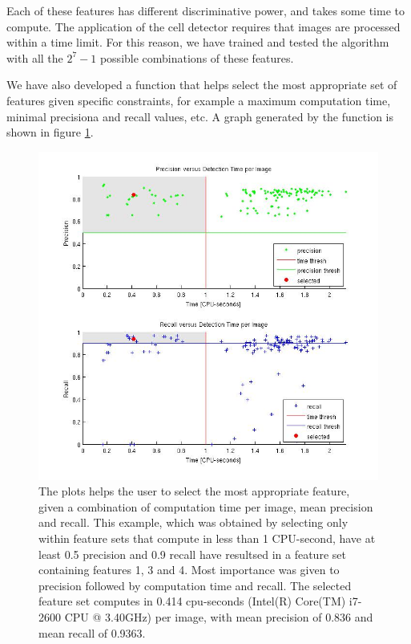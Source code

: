	Each of these features has different discriminative power, and takes some time to compute. The application of the cell detector requires that images are processed within a time limit. For this reason, we have trained and tested the algorithm with all the $2^7 - 1$ possible combinations of these features.
	
	We have also developed a function that helps select the most appropriate set of features given specific constraints, for example a maximum computation time, minimal precisiona and recall values, etc. A graph generated by the function is shown in figure \ref{fig:bestFeatureSelector}.
	
	\begin{figure}
		  \includegraphics[width=\textwidth]{images/best_features}
		\caption{The plots helps the user to select the most appropriate feature, given a combination of computation time per image, mean precision and recall. This example, which was obtained by selecting only within feature sets that compute in less than 1 CPU-second, have at least 0.5 precision and 0.9 recall have resultsed in a feature set containing features 1, 3 and 4. Most importance was given to precision followed by computation time and recall. The selected feature set computes in 0.414 cpu-seconds (Intel(R) Core(TM) i7-2600 CPU @ 3.40GHz) per image, with mean precision of 0.836 and mean recall of 0.9363.}
	    \label{fig:bestFeatureSelector}
	\end{figure}
	